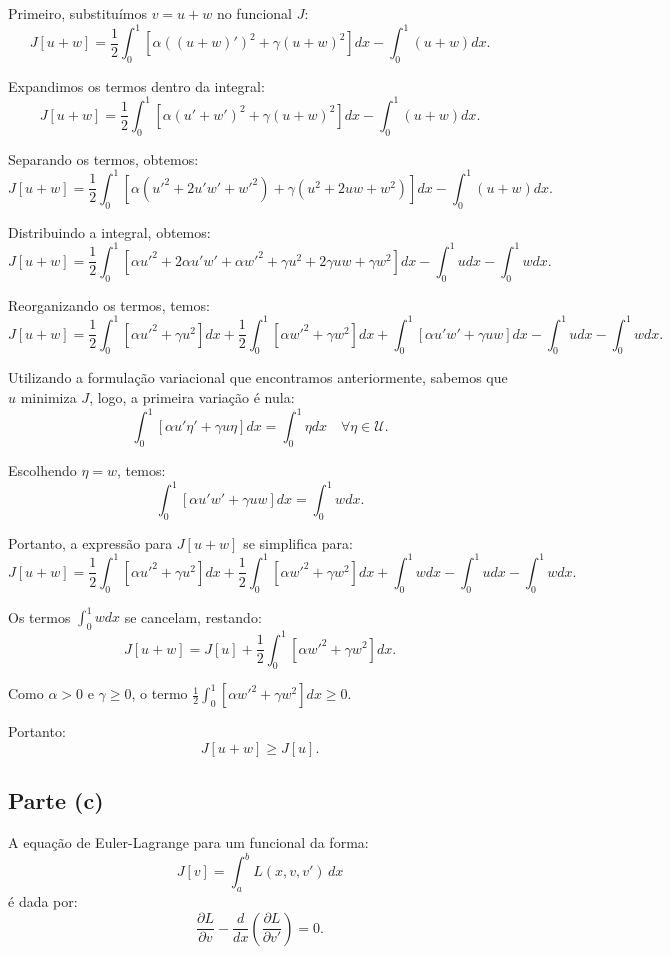 \documentclass{article}
\begin{document}
Primeiro, substituímos \( v = u + w \) no funcional \( J \):
\[
J[u + w] = \frac{1}{2} \int_0^1 \left[ \alpha ((u + w)')^2 + \gamma (u + w)^2 \right] dx - \int_0^1 (u + w) dx.
\]

Expandimos os termos dentro da integral:
\[
J[u + w] = \frac{1}{2} \int_0^1 \left[ \alpha (u' + w')^2 + \gamma (u + w)^2 \right] dx - \int_0^1 (u + w) dx.
\]

Separando os termos, obtemos:
\[
J[u + w] = \frac{1}{2} \int_0^1 \left[ \alpha (u'^2 + 2u'w' + w'^2) + \gamma (u^2 + 2uw + w^2) \right] dx - \int_0^1 (u + w) dx.
\]

Distribuindo a integral, obtemos:
\[
J[u + w] = \frac{1}{2} \int_0^1 \left[ \alpha u'^2 + 2\alpha u'w' + \alpha w'^2 + \gamma u^2 + 2\gamma uw + \gamma w^2 \right] dx - \int_0^1 u dx - \int_0^1 w dx.
\]

Reorganizando os termos, temos:
\[
J[u + w] = \frac{1}{2} \int_0^1 \left[ \alpha u'^2 + \gamma u^2 \right] dx + \frac{1}{2} \int_0^1 \left[ \alpha w'^2 + \gamma w^2 \right] dx + \int_0^1 \left[ \alpha u'w' + \gamma uw \right] dx - \int_0^1 u dx - \int_0^1 w dx.
\]

Utilizando a formulação variacional que encontramos anteriormente, sabemos que \( u \) minimiza \( J \), logo, a primeira variação é nula:
\[
\int_0^1 \left[ \alpha u' \eta' + \gamma u \eta \right] dx = \int_0^1 \eta dx \quad \forall \eta \in \mathcal{U}.
\]

Escolhendo \( \eta = w \), temos:
\[
\int_0^1 \left[ \alpha u' w' + \gamma u w \right] dx = \int_0^1 w dx.
\]

Portanto, a expressão para \( J[u + w] \) se simplifica para:
\[
J[u + w] = \frac{1}{2} \int_0^1 \left[ \alpha u'^2 + \gamma u^2 \right] dx + \frac{1}{2} \int_0^1 \left[ \alpha w'^2 + \gamma w^2 \right] dx + \int_0^1 w dx - \int_0^1 u dx - \int_0^1 w dx.
\]

Os termos \(\int_0^1 w dx\) se cancelam, restando:
\[
J[u + w] = J[u] + \frac{1}{2} \int_0^1 \left[ \alpha w'^2 + \gamma w^2 \right] dx.
\]

Como \(\alpha > 0\) e \(\gamma \geq 0\), o termo \(\frac{1}{2} \int_0^1 \left[ \alpha w'^2 + \gamma w^2 \right] dx \geq 0\).

Portanto:
\[
J[u + w] \geq J[u].
\]

\subsection{Parte (c)}
A equação de Euler-Lagrange para um funcional da forma:
\[
J[v] = \int_a^b L(x, v, v') \, dx
\]
é dada por:
\[
\frac{\partial L}{\partial v} - \frac{d}{dx} \left( \frac{\partial L}{\partial v'} \right) = 0.
\]
\end{document}
